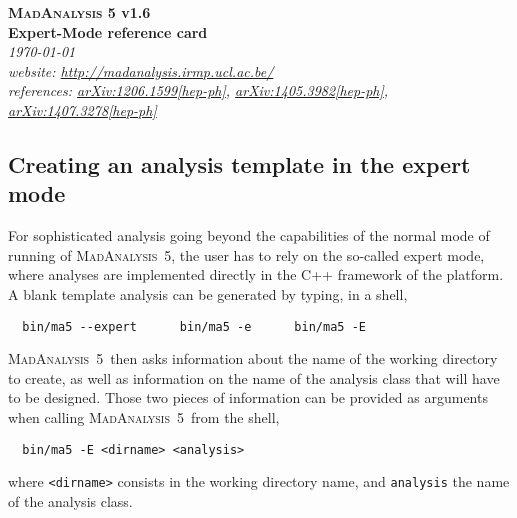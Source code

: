 \documentclass[a4paper]{article}
\newcommand{\MA}{\textsc{MadAnalysis}~5}
\begin{document}
\begin{center} 
{\color{ao} \huge \textbf{\textsc{MadAnalysis} 5 v1.6}} \\ \vspace{0.25cm}
{\color{ao} \huge \textbf{Expert-Mode reference card}} \\ \vspace{0.25cm}
\vspace{0.1cm} \textsl{\today}\\
\vspace{0.1cm} \textsl{website: \url{http://madanalysis.irmp.ucl.ac.be/}}\\
\vspace{0.1cm} \textsl{references: \href{https://arxiv.org/abs/1206.1599}{arXiv:1206.1599[hep-ph]}, \href{https://arxiv.org/abs/1405.3982}{arXiv:1405.3982[hep-ph]}, \href{https://arxiv.org/abs/1407.3278}{arXiv:1407.3278[hep-ph]}}
\end{center}

\hspace{0.5cm}

\begin{shaded}
\section{\Large Creating an analysis template in the expert mode}
\end{shaded}

\noindent For sophisticated analysis going beyond the capabilities of the normal mode of
running of \MA, the user has to rely on the so-called expert mode, where
analyses are implemented directly in the C++ framework of the platform. A blank
template analysis can be generated by typing, in a shell,
{\color{ao}\begin{verbatim}
  bin/ma5 --expert      bin/ma5 -e      bin/ma5 -E
\end{verbatim}}
\noindent \MA\ then asks information about the name of the working directory to create, as
well as information on the name of the analysis class that will have to be
designed. Those two pieces of information can be provided as arguments when
calling \MA\ from the shell,
{\color{ao}\begin{verbatim}
  bin/ma5 -E <dirname> <analysis>
\end{verbatim}}
\noindent where \verb+<dirname>+ consists in the working directory name, and
\verb+analysis+ the name of the analysis class.\\
\end{document}
